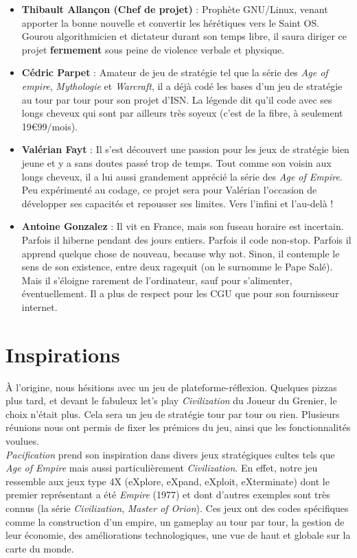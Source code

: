 \documentclass[12pt]{report}
\begin{document}
\begin{itemize}[label=\textbullet]
\item \textbf{Thibault Allançon (Chef de projet)} : Prophète GNU/Linux, venant apporter la bonne nouvelle et convertir les hérétiques vers le Saint OS. Gourou algorithmicien et dictateur durant son temps libre, il saura diriger ce projet \textbf{fermement} sous peine de violence verbale et physique. 
\item \textbf{Cédric Parpet} : Amateur de jeu de stratégie tel que la série des \textit{Age of empire}, \textit{Mythologie} et \textit{Warcraft}, il a déjà codé les bases d’un jeu de stratégie au tour par tour pour son projet d’ISN. La légende dit qu’il code avec ses longs cheveux qui sont par ailleurs très soyeux (c’est de la fibre, à seulement 19\euro99/mois).
\item \textbf{Valérian Fayt} : Il s’est découvert une passion pour les jeux de stratégie bien jeune et y a sans doutes passé trop de temps. Tout comme son voisin aux longs cheveux, il a lui aussi grandement apprécié la série des \textit{Age of Empire}. Peu expérimenté au codage, ce projet sera pour Valérian l’occasion de développer ses capacités et repousser ses limites. Vers l’infini et l’au-delà !
\item \textbf{Antoine Gonzalez} : Il vit en France, mais son fuseau horaire est incertain. Parfois il hiberne pendant des jours entiers. Parfois il code non-stop. Parfois il apprend quelque chose de nouveau, because why not. Sinon, il contemple le sens de son existence, entre deux ragequit (on le surnomme le Pape Salé). Mais il s’éloigne rarement de l’ordinateur, sauf pour s’alimenter, éventuellement. Il a plus de respect pour les CGU que pour son fournisseur internet.
\end{itemize}

\section{Inspirations}

À l’origine, nous hésitions avec un jeu de plateforme-réflexion. Quelques pizzas plus tard, et devant le fabuleux let’s play \textit{Civilization} du Joueur du Grenier, le choix n’était plus. Cela sera un jeu de stratégie tour par tour ou rien. Plusieurs réunions nous ont permis de fixer les prémices du jeu, ainsi que les fonctionnalités voulues.\\

\textit{Pacification} prend son inspiration dans divers jeux stratégiques cultes tels que \textit{Age of Empire} mais aussi particulièrement \textit{Civilization}. En effet, notre jeu ressemble aux jeux type 4X (eXplore, eXpand, eXploit, eXterminate) dont le premier représentant a été \textit{Empire} (1977) et dont d’autres exemples sont très connus (la série \textit{Civilization}, \textit{Master of Orion}). Ces jeux ont des codes spécifiques comme la construction d’un empire, un gameplay au tour par tour, la gestion de leur économie, des améliorations technologiques, une vue de haut et globale sur la carte du monde.\\
\end{document}
